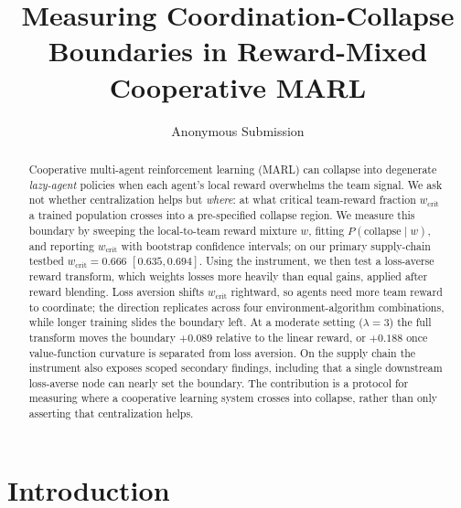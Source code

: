 \documentclass[letterpaper]{article} %
\title{Measuring Coordination-Collapse Boundaries in Reward-Mixed Cooperative MARL}
\author{
  Anonymous Submission
}
\theoremstyle{plain}
\newcommand{\wcrit}{w_{\mathrm{crit}}}
\begin{document}
\maketitle

\begin{abstract}
Cooperative multi-agent reinforcement learning (MARL) can collapse into degenerate
\emph{lazy-agent} policies when each agent's local reward overwhelms the team signal. We ask not
whether centralization helps but \emph{where}: at what critical team-reward fraction $\wcrit$ a
trained population crosses into a pre-specified collapse region. We measure this boundary by
sweeping the local-to-team reward mixture $w$, fitting $P(\mathrm{collapse}\mid w)$, and reporting
$\wcrit$ with bootstrap confidence intervals; on our primary supply-chain testbed
$\wcrit=0.666$ $[0.635,0.694]$. Using the instrument, we then test a loss-averse reward transform,
which weights losses more heavily than equal gains, applied after reward blending. Loss aversion
shifts $\wcrit$ rightward, so agents need more team reward to coordinate; the direction replicates
across four environment-algorithm combinations, while longer training slides the boundary left. At
a moderate setting ($\lambda{=}3$) the full transform moves the boundary $+0.089$ relative to the
linear reward, or $+0.188$ once value-function curvature is separated from loss aversion. On the
supply chain the instrument also exposes scoped secondary findings, including that a single
downstream loss-averse node can nearly set the boundary. The contribution is a protocol for
measuring where a cooperative learning system crosses into collapse, rather than only asserting
that centralization helps.
\end{abstract}

\section{Introduction}
\label{sec:intro}
\end{document}
